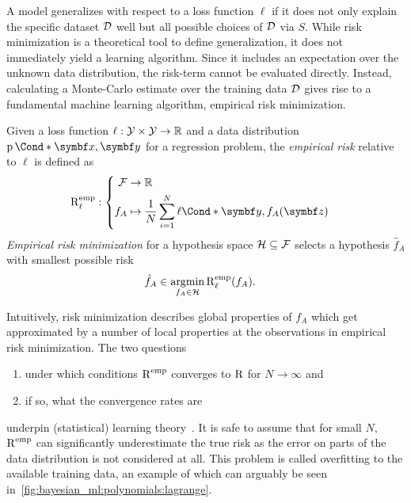 A model generalizes with respect to a loss function $\ell$ if it does not only explain the specific dataset $\mathcal{D}$ well but all possible choices of $\mathcal{D}$ via $S$.
While risk minimization is a theoretical tool to define generalization, it does not immediately yield a learning algorithm.
Since it includes an expectation over the unknown data distribution, the risk-term cannot be evaluated directly.
Instead, calculating a Monte-Carlo estimate over the training data $\mathcal{D}$ gives rise to a fundamental machine learning algorithm, empirical risk minimization.

\begin{definition}
    \label{def:empirical_risk_minimization}
    Given a loss function $\ell: \mathcal{Y} \times \mathcal{Y} \to \mathbb{R}$ and a data distribution $\Prob*{\mat{x}, \mat{y}}$ for a regression problem, the \emph{empirical risk} relative to $\ell$ is defined as
    \begin{align}
        \risk^{\text{emp}}_\ell & : \left\{
        \begin{aligned}
            \Fc & \to \Rb                                                             \\
            f_A & \mapsto \frac{1}{N} \sum_{i=1}^N \Fun*{\ell}{\mat{y}, f_A(\mat{z})}
        \end{aligned}
        \right.
    \end{align}
    \emph{Empirical risk minimization} for a hypothesis space $\mathcal{H} \subseteq \mathcal{F}$ selects a hypothesis $\hat{f}_A$ with smallest possible risk
    \begin{align}
        \hat{f}_A & \in \operatorname*{argmin}_{f_A \in \mathcal{H}} \operatorname{R}^{\text{emp}}_\ell(f_A).
    \end{align}
\end{definition}

Intuitively, risk minimization describes global properties of $f_A$ which get approximated by a number of local properties at the observations in empirical risk minimization.
The two questions
\begin{enumerate}
    \item under which conditions $\operatorname{R}^{\text{emp}}$ converges to $\operatorname{R}$ for $N \to \infty$ and
    \item if so, what the convergence rates are
\end{enumerate}
underpin (statistical) learning theory~\parencite{vapnik_principles_1992}.
It is safe to assume that for small $N$, $\operatorname{R}^{\text{emp}}$ can significantly underestimate the true risk as the error on parts of the data distribution is not considered at all.
This problem is called overfitting to the available training data, an example of which can arguably be seen in~\cref{fig:bayesian_ml:polynomials:lagrange}.

